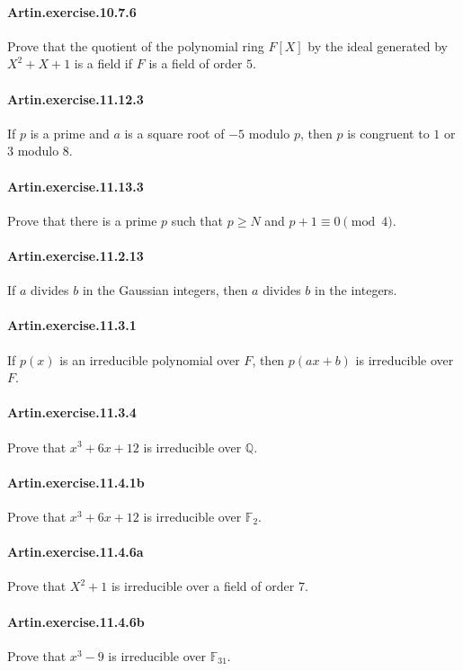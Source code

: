 \documentclass{article}
\begin{document}
\paragraph{Artin.exercise.10.7.6} Prove that the quotient of the polynomial ring $F[X]$ by the ideal generated by $X^2+X+1$ is a field if $F$ is a field of order $5$.

\paragraph{Artin.exercise.11.12.3} If $p$ is a prime and $a$ is a square root of $-5$ modulo $p$, then $p$ is congruent to $1$ or $3$ modulo $8$.

\paragraph{Artin.exercise.11.13.3} Prove that there is a prime $p$ such that $p\geq N$ and $p+1\equiv 0\pmod{4}$.

\paragraph{Artin.exercise.11.2.13} If $a$ divides $b$ in the Gaussian integers, then $a$ divides $b$ in the integers.

\paragraph{Artin.exercise.11.3.1} If $p(x)$ is an irreducible polynomial over $F$, then $p(ax+b)$ is irreducible over $F$.

\paragraph{Artin.exercise.11.3.4} Prove that $x^3 + 6x + 12$ is irreducible over $\mathbb{Q}$.

\paragraph{Artin.exercise.11.4.1b} Prove that $x^3+6x+12$ is irreducible over $\mathbb{F}_2$.

\paragraph{Artin.exercise.11.4.6a} Prove that $X^2+1$ is irreducible over a field of order $7$.

\paragraph{Artin.exercise.11.4.6b} Prove that $x^3-9$ is irreducible over $\mathbb{F}_{31}$.
\end{document}
